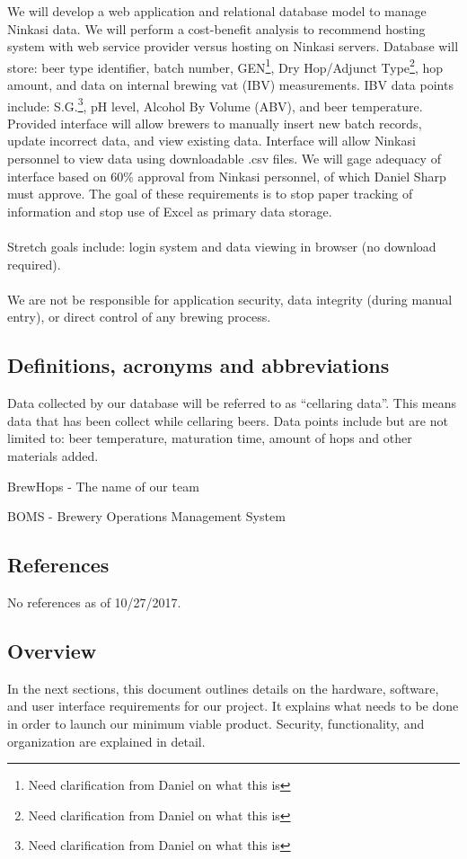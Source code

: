 \documentclass[draftclsnofoot,onecolumn,letterpaper,10pt,compsoc]{IEEEtran}
\begin{document}
		We will develop a web application and relational database model to manage Ninkasi data.
		We will perform a cost-benefit analysis to recommend hosting system with web service provider versus hosting on Ninkasi servers.
		Database will store: beer type identifier, batch number, GEN\footnote{Need clarification from Daniel on what this is}, Dry Hop/Adjunct Type\footnote{Need clarification from Daniel on what this is}, hop amount, and data on internal brewing vat (IBV) measurements.
		IBV data points include: S.G.\footnote{Need clarification from Daniel on what this is}, pH level, Alcohol By Volume (ABV), and beer temperature.
		Provided interface will allow brewers to manually insert new batch records, update incorrect data, and view existing data.
		Interface will allow Ninkasi personnel to view data using downloadable .csv files.
		We will gage adequacy of interface based on 60\% approval from Ninkasi personnel, of which Daniel Sharp must approve.
		The goal of these requirements is to stop paper tracking of information and stop use of Excel as primary data storage.
		\\
		\\
		Stretch goals include: login system and data viewing in browser (no download required).
		\\
		\\
		We are not be responsible for application security, data integrity (during manual entry), or direct control of any brewing process.

	\subsection{Definitions, acronyms and abbreviations}
		Data collected by our database will be referred to as “cellaring data”.
		This means data that has been collect while cellaring beers.
		Data points include but are not limited to: beer temperature, maturation time, amount of hops and other materials added.

		BrewHops - The name of our team

		BOMS - Brewery Operations Management System


	\subsection{References}
    No references as of 10/27/2017.
	\subsection{Overview}
		In the next sections, this document outlines details on the hardware, software, and user interface requirements for our project.
		It explains what needs to be done in order to launch our minimum viable product.
		Security, functionality, and organization are explained in detail.
\end{document}
